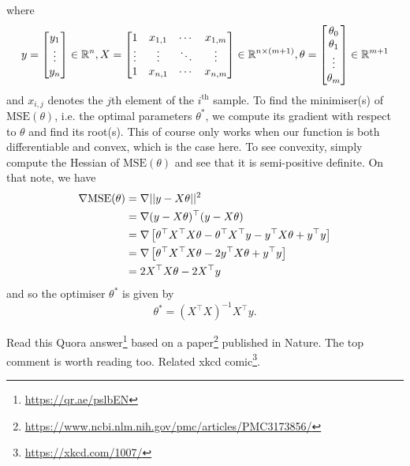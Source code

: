 \documentclass[11pt]{article}
\begin{document}
where
$$
y
=
\begin{bmatrix}
    y_1\\
    \vdots\\
    y_n
\end{bmatrix}
\in\mathbb{R}^n,
X
=
\begin{bmatrix}
    1 & x_{1,1} & \cdots & x_{1,m}\\
    \vdots & \vdots & \ddots & \vdots\\
    1 & x_{n,1} & \cdots & x_{n,m}
\end{bmatrix}
\in\mathbb{R}^{n\times (m+1)},
\theta
=
\begin{bmatrix}
    \theta_0\\
    \theta_1\\
    \vdots\\
    \theta_m
\end{bmatrix}
\in\mathbb{R}^{m+1}
$$
and $x_{i,j}$ denotes the $j$th element of the $i^{\text{th}}$ sample. To find the minimiser(s) of $\text{MSE}(\theta)$, i.e. the optimal parameters $\theta^{*}$, we compute its gradient with respect to $\theta$ and find its root(s). This of course only works when our function is both differentiable and convex, which is the case here. To see convexity, simply compute the Hessian of $\text{MSE}(\theta)$ and see that it is semi-positive definite. On that note, we have
\begin{align*}
    \nabla\text{MSE}(\theta)
    &=
    \nabla||y-X\theta||^2\\
    &=
    \nabla(y-X\theta)^{\top}(y-X\theta)\\
    &=
    \nabla\left[\theta^{\top}X^{\top}X\theta-\theta^{\top}X^{\top}y-y^{\top}X\theta+y^{\top}y\right]\\
    &=
    \nabla\left[\theta^{\top}X^{\top}X\theta-2y^{\top}X\theta+y^{\top}y\right]\\
    &=
    2X^{\top}X\theta-2X^{\top}y
\end{align*}
and so the optimiser $\theta^{*}$ is given by
$$
\theta^{*}=(X^{\top}X)^{-1}X^{\top}y.
$$

\begin{tcolorbox}[title={\textbf{Funny misuse of linear regression: Momentous sprint at the 2156 Olympics?}}, colback=myLightBlue, colbacktitle=myDarkBlue, colframe=myDarkBlue, coltitle=white]
    Read this Quora answer\footnote{\url{https://qr.ae/pslbEN}} based on a paper\footnote{\url{https://www.ncbi.nlm.nih.gov/pmc/articles/PMC3173856/}} published in Nature. The top comment is worth reading too. Related xkcd comic\footnote{\url{https://xkcd.com/1007/}}.
\end{tcolorbox}
\end{document}

